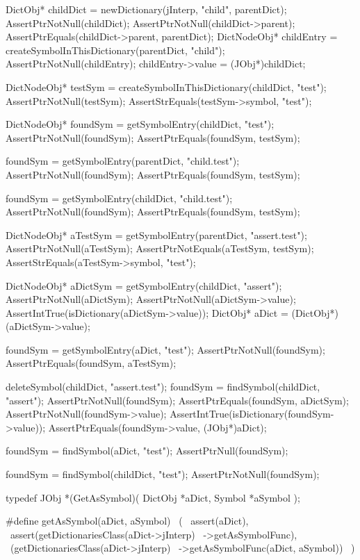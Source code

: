   DictObj* childDict =
    newDictionary(jInterp, "child", parentDict);
  AssertPtrNotNull(childDict);
  AssertPtrNotNull(childDict->parent);
  AssertPtrEquals(childDict->parent, parentDict);
  DictNodeObj* childEntry =
    createSymbolInThisDictionary(parentDict, "child");
  AssertPtrNotNull(childEntry);
  childEntry->value = (JObj*)childDict;
  
  DictNodeObj* testSym = 
    createSymbolInThisDictionary(childDict, "test");
  AssertPtrNotNull(testSym);
  AssertStrEquals(testSym->symbol, "test");
  
  DictNodeObj* foundSym =
    getSymbolEntry(childDict, "test");
  AssertPtrNotNull(foundSym);
  AssertPtrEquals(foundSym, testSym);

  foundSym = getSymbolEntry(parentDict, "child.test");
  AssertPtrNotNull(foundSym);
  AssertPtrEquals(foundSym, testSym);
  
  foundSym = getSymbolEntry(childDict, "child.test");
  AssertPtrNotNull(foundSym);
  AssertPtrEquals(foundSym, testSym);
  
  DictNodeObj* aTestSym =
    getSymbolEntry(parentDict, "assert.test");
  AssertPtrNotNull(aTestSym);
  AssertPtrNotEquals(aTestSym, testSym);
  AssertStrEquals(aTestSym->symbol, "test");
  
  DictNodeObj* aDictSym =
    getSymbolEntry(childDict, "assert");
  AssertPtrNotNull(aDictSym);
  AssertPtrNotNull(aDictSym->value);
  AssertIntTrue(isDictionary(aDictSym->value));
  DictObj* aDict = (DictObj*)(aDictSym->value);
  
  foundSym = getSymbolEntry(aDict, "test");
  AssertPtrNotNull(foundSym);
  AssertPtrEquals(foundSym, aTestSym);
  
  deleteSymbol(childDict, "assert.test");
  foundSym = findSymbol(childDict, "assert");
  AssertPtrNotNull(foundSym);
  AssertPtrEquals(foundSym, aDictSym);
  AssertPtrNotNull(foundSym->value);
  AssertIntTrue(isDictionary(foundSym->value));
  AssertPtrEquals(foundSym->value, (JObj*)aDict);
  
  foundSym = findSymbol(aDict, "test");
  AssertPtrNull(foundSym);
  
  foundSym = findSymbol(childDict, "test");
  AssertPtrNotNull(foundSym);
\stopCTest
\stopTestCase
\stopTestSuite

\startTestSuite[getAsSymbol]

\startCHeader
typedef JObj *(GetAsSymbol)(
  DictObj *aDict,
  Symbol  *aSymbol
);

#define getAsSymbol(aDict, aSymbol)             \
  (                                             \
    assert(aDict),                              \
    assert(getDictionariesClass(aDict->jInterp) \
      ->getAsSymbolFunc),                       \
    (getDictionariesClass(aDict->jInterp)       \
      ->getAsSymbolFunc(aDict, aSymbol))        \
  )
\stopCHeader


